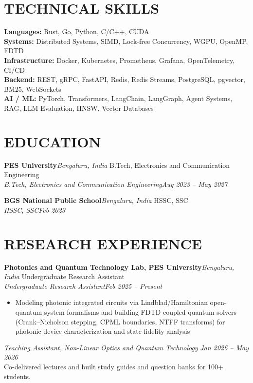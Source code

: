 \documentclass[letterpaper,11pt]{article}
\newcommand{\entry}[4]{%
  \par\vspace{5pt}
  \noindent\textbf{#1}\hfill\textit{#2}%
  \ifx\relax#3\relax\else%
    \\[-1pt]\textit{#3}\hfill\textit{#4}%
  \fi%
  \par\vspace{1pt}%
}
\begin{document}
\section{TECHNICAL SKILLS}

\noindent
\textbf{Languages:} Rust, Go, Python, C/C++, CUDA \\
\textbf{Systems:} Distributed Systems, SIMD, Lock-free Concurrency, WGPU, OpenMP, FDTD \\
\textbf{Infrastructure:} Docker, Kubernetes, Prometheus, Grafana, OpenTelemetry, CI/CD \\
\textbf{Backend:} REST, gRPC, FastAPI, Redis, Redis Streams, PostgreSQL, pgvector,
  BM25, WebSockets \\
\textbf{AI / ML:} PyTorch, Transformers, LangChain, LangGraph, Agent Systems,
  RAG, LLM Evaluation, HNSW, Vector Databases

\section{EDUCATION}

\entry{PES University}{Bengaluru, India}
{B.Tech, Electronics and Communication Engineering}{Aug 2023 -- May 2027}

\entry{BGS National Public School}{Bengaluru, India}
{HSSC, SSC}{Feb 2023}

\section{RESEARCH EXPERIENCE}

\entry{Photonics and Quantum Technology Lab, PES University}{Bengaluru, India}
{Undergraduate Research Assistant}{Feb 2025 -- Present}
\begin{itemize}
  \item Modeling photonic integrated circuits via Lindblad/Hamiltonian open-quantum-system
        formalisms and building FDTD-coupled quantum solvers (Crank--Nicholson stepping,
        CPML boundaries, NTFF transforms) for photonic device characterization and state
        fidelity analysis
\end{itemize}

\vspace{3pt}
\noindent\textit{Teaching Assistant, Non-Linear Optics and Quantum Technology}
\hfill \textit{Jan 2026 -- May 2026}\\
Co-delivered lectures and built study guides and question banks for 100+ students.
\end{document}
